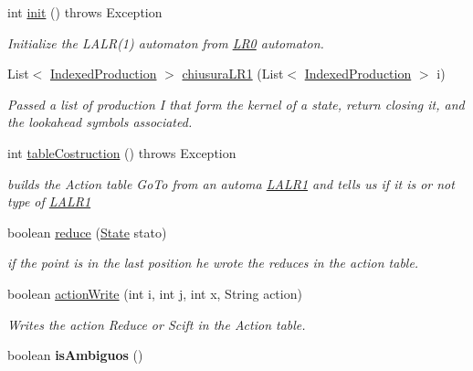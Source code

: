 \begin{DoxyCompactItemize}
\item 
int \hyperlink{classcontext_free_1_1parser_1_1_l_a_l_r1_a7618cff4af4edfffb9a538a7cb1e79cf}{init} ()  throws Exception
\begin{DoxyCompactList}\small\item\em Initialize the L\-A\-L\-R(1) automaton from \hyperlink{classcontext_free_1_1parser_1_1_l_r0}{L\-R0} automaton. \end{DoxyCompactList}\item 
List$<$ \hyperlink{classcontext_free_1_1parser_1_1_indexed_production}{Indexed\-Production} $>$ \hyperlink{classcontext_free_1_1parser_1_1_l_a_l_r1_ac711dbbc2be25d15c1a8aade7579e94e}{chiusura\-L\-R1} (List$<$ \hyperlink{classcontext_free_1_1parser_1_1_indexed_production}{Indexed\-Production} $>$ i)
\begin{DoxyCompactList}\small\item\em Passed a list of production I that form the kernel of a state, return closing it, and the lookahead symbols associated. \end{DoxyCompactList}\item 
int \hyperlink{classcontext_free_1_1parser_1_1_l_a_l_r1_a79576626b3b59b832faecc986b293b36}{table\-Costruction} ()  throws Exception
\begin{DoxyCompactList}\small\item\em builds the Action table Go\-To from an automa \hyperlink{classcontext_free_1_1parser_1_1_l_a_l_r1}{L\-A\-L\-R1} and tells us if it is or not type of \hyperlink{classcontext_free_1_1parser_1_1_l_a_l_r1}{L\-A\-L\-R1} \end{DoxyCompactList}\item 
boolean \hyperlink{classcontext_free_1_1parser_1_1_l_a_l_r1_a2281981b3043c0150c1b3d3967572b1f}{reduce} (\hyperlink{classcontext_free_1_1parser_1_1_state}{State} stato)
\begin{DoxyCompactList}\small\item\em if the point is in the last position he wrote the reduces in the action table. \end{DoxyCompactList}\item 
boolean \hyperlink{classcontext_free_1_1parser_1_1_l_a_l_r1_a7379103379c94e377daca0022b28771e}{action\-Write} (int i, int j, int x, String action)
\begin{DoxyCompactList}\small\item\em Writes the action Reduce or Scift in the Action table. \end{DoxyCompactList}\item 
\hypertarget{classcontext_free_1_1parser_1_1_l_a_l_r1_a9c19be71fc16e04343eb3c23b6eac9da}{boolean {\bfseries is\-Ambiguos} ()}\label{classcontext_free_1_1parser_1_1_l_a_l_r1_a9c19be71fc16e04343eb3c23b6eac9da}


\end{DoxyCompactItemize}
